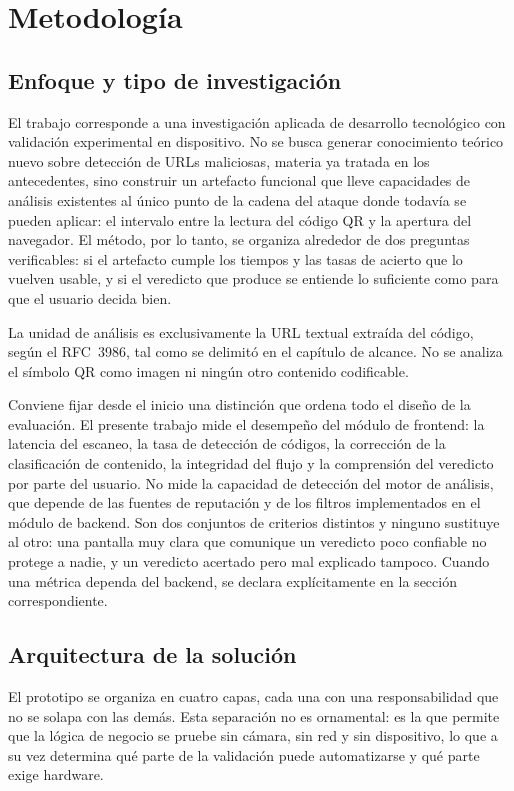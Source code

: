 \chapter{Metodología}

\section{Enfoque y tipo de investigación}

El trabajo corresponde a una investigación aplicada de desarrollo tecnológico con
validación experimental en dispositivo. No se busca generar conocimiento teórico
nuevo sobre detección de URLs maliciosas, materia ya tratada en los antecedentes,
sino construir un artefacto funcional que lleve capacidades de análisis existentes
al único punto de la cadena del ataque donde todavía se pueden aplicar: el intervalo
entre la lectura del código QR y la apertura del navegador. El método, por lo tanto,
se organiza alrededor de dos preguntas verificables: si el artefacto cumple los
tiempos y las tasas de acierto que lo vuelven usable, y si el veredicto que produce
se entiende lo suficiente como para que el usuario decida bien.

La unidad de análisis es exclusivamente la URL textual extraída del código, según el
RFC~3986, tal como se delimitó en el capítulo de alcance. No se analiza el símbolo QR
como imagen ni ningún otro contenido codificable.

Conviene fijar desde el inicio una distinción que ordena todo el diseño de la
evaluación. El presente trabajo mide el desempeño del módulo de frontend: la latencia
del escaneo, la tasa de detección de códigos, la corrección de la clasificación de
contenido, la integridad del flujo y la comprensión del veredicto por parte del
usuario. No mide la capacidad de detección del motor de análisis, que depende de las
fuentes de reputación y de los filtros implementados en el módulo de backend. Son
dos conjuntos de criterios distintos y ninguno sustituye al otro: una pantalla muy
clara que comunique un veredicto poco confiable no protege a nadie, y un veredicto
acertado pero mal explicado tampoco. Cuando una métrica dependa del backend, se
declara explícitamente en la sección correspondiente.

\section{Arquitectura de la solución}

El prototipo se organiza en cuatro capas, cada una con una responsabilidad que no se
solapa con las demás. Esta separación no es ornamental: es la que permite que la
lógica de negocio se pruebe sin cámara, sin red y sin dispositivo, lo que a su vez
determina qué parte de la validación puede automatizarse y qué parte exige hardware.

